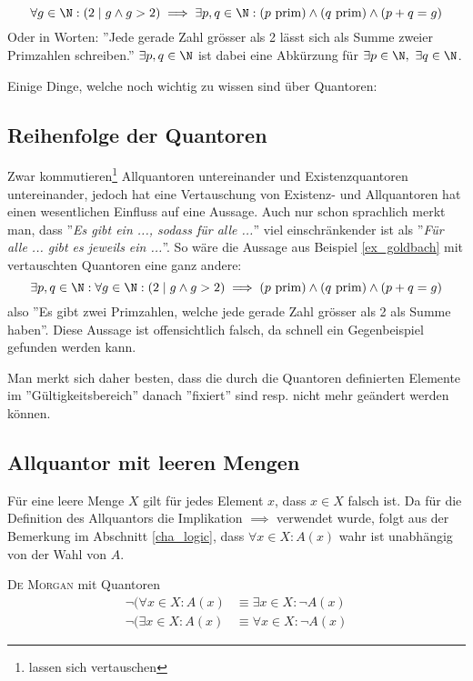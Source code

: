 \begin{example}\label{ex_goldbach}
$$\forall g \in \N : (2 \mid g \land g > 2) \implies \exists p,q \in \N: (\text{$p$ prim}) \land (\text{$q$ prim})\land (p + q = g)$$
Oder in Worten: ''Jede gerade Zahl grösser als 2 lässt sich als Summe zweier Primzahlen schreiben.'' $\exists p,q \in \N$ ist dabei eine Abkürzung für $\exists p \in \N,\ \exists q \in \N$.
\end{example}

Einige Dinge, welche noch wichtig zu wissen sind über Quantoren: 

\subsection{Reihenfolge der Quantoren}
Zwar kommutieren\footnote{lassen sich vertauschen} Allquantoren untereinander und Existenzquantoren untereinander, jedoch hat eine Vertauschung von Existenz- und Allquantoren hat einen wesentlichen Einfluss auf eine Aussage. Auch nur schon sprachlich merkt man, dass ''\textit{Es gibt ein ..., sodass für alle ...}'' viel einschränkender ist als ''\textit{Für alle ... gibt es jeweils ein ...}''. So wäre die Aussage aus Beispiel \ref{ex_goldbach} mit vertauschten Quantoren eine ganz andere: 
$$\exists p,q \in \N: \forall g \in \N : (2 \mid g \land g > 2) \implies (\text{$p$ prim}) \land (\text{$q$ prim})\land (p + q = g)$$
also ''Es gibt zwei Primzahlen, welche jede gerade Zahl grösser als 2 als Summe haben''. Diese Aussage ist offensichtlich falsch, da schnell ein Gegenbeispiel gefunden werden kann.

Man merkt sich daher besten, dass die durch die Quantoren definierten Elemente im ''Gültigkeitsbereich'' danach ''fixiert'' sind resp. nicht mehr geändert werden können. 

\subsection{Allquantor mit leeren Mengen}
Für eine leere Menge $X$ gilt für jedes Element $x$, dass $x\in X$ falsch ist. Da für die Definition des Allquantors die Implikation $\implies$ verwendet wurde, folgt aus der Bemerkung im Abschnitt \ref{cha_logic}, dass $\forall x \in X : A(x)$ wahr ist unabhängig von der Wahl von $A$.

\begin{lemma}{\textsc{De Morgan} mit Quantoren}{}
\begin{align*}
        \neg(\forall x \in X : A(x) &\equiv \exists x \in X : \neg A(x)\\
        \neg(\exists x \in X : A(x) &\equiv \forall x \in X : \neg A(x)
\end{align*}
\end{lemma}


